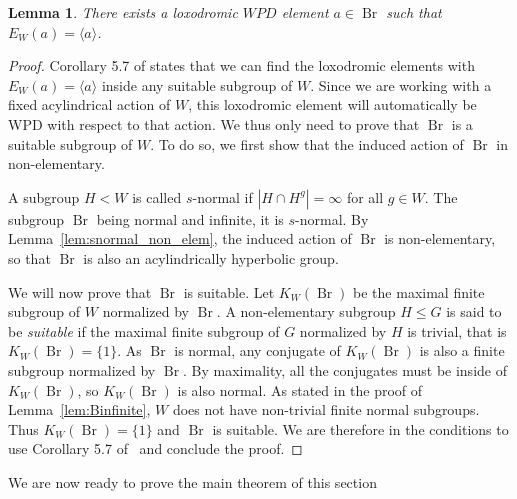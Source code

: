 \documentclass[10pt,a4paper]{amsart}
\newtheorem{lemma}[prop]{Lemma}
\newcommand{\Br}{\operatorname{Br}}
\begin{document}
\begin{lemma}\label{lem:existanceLoxodromic}
    There exists a loxodromic $WPD$ element $a \in \Br$ such that $E_W(a) = \langle a \rangle$. 
\end{lemma}
\begin{proof}
    Corollary 5.7 of \cite{hull2017small} states that we can find the loxodromic elements with $E_W(a)=\langle a\rangle$ inside any suitable subgroup of $W$. Since we are working with a fixed acylindrical action of $W$, this loxodromic element will automatically be WPD with respect to that action. We thus only need to prove that $\Br$ is a suitable subgroup of $W$. To do so, we first show that the induced action of $\Br$ in non-elementary.

    A subgroup $H < W$ is called $s$-normal if $|H \cap H^g| = \infty$ for all $g \in W$. The subgroup $\Br$ being normal and infinite, it is $s$-normal. By Lemma~\ref{lem:snormal_non_elem}, the induced action of $\Br$ is non-elementary, so that $\Br$ is also an acylindrically hyperbolic group. 
    
    We will now prove that $\Br$ is suitable. 
    Let $K_W(\Br)$ be the maximal finite subgroup of $W$ normalized by $\Br$.
    A non-elementary subgroup $H\leq G$ is said to be \emph{suitable} if the maximal finite subgroup of $G$ normalized by $H$ is trivial, that is $K_W(\Br)=\{ 1\}$. As $\Br$ is normal, any conjugate of $K_W(\Br)$ is also a finite subgroup normalized by $\Br$. By maximality, all the conjugates must be inside of $K_W(\Br)$, so $K_W(\Br)$ is also normal. As stated in the proof of Lemma~\ref{lem:Binfinite}, $W$ does not have non-trivial finite normal subgroups. Thus $K_W(\Br)=\{ 1\}$ and $\Br$ is suitable.
    We are therefore in the conditions to use Corollary 5.7 of~\cite{hull2017small} and conclude the proof. 
    \end{proof}

We are now ready to prove the main theorem of this section
\end{document}
